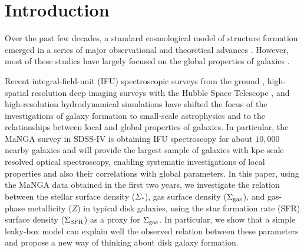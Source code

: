 \documentclass[12pt, appendixfloats, numberedappendix]{emulateapj}
\begin{document}
\section{Introduction}\label{intro}



Over the past few decades, a standard cosmological model of structure formation emerged 
in a series of major observational and theoretical advances \citep[\eg][]{white78a}. 
However, most of these studies have largely focused on the global properties of galaxies
\citep[\eg][]{kauffmann93a, springel05a, somerville15a}.

Recent integral-field-unit (IFU) spectroscopic surveys from the ground \citep[\eg][]{bacon01a, rosales10a, sanchez12a},
high-spatial resolution deep imaging surveys with the Hubble Space Telescope \citep[\eg][]{scoville07a, koekemoer11a}, 
and high-resolution hydrodynamical simulations \citep[\eg][]{vogelsberger14a, hopkins14a} have shifted the focus of 
the investigations of galaxy formation to small-scale astrophysics and to the relationships between local and global properties of galaxies.
In particular, the MaNGA survey \citep[][]{bundy15a} in SDSS-IV \citep[][]{blanton17a} is
obtaining IFU spectroscopy for about $10,000$ nearby galaxies and will provide the largest sample of galaxies with kpc-scale 
resolved optical spectroscopy, enabling systematic investigations of local properties and also their correlations with global parameters.
In this paper, using the MaNGA data obtained in the first two years, we investigate the relation 
between the stellar surface density ($\Sigma_*$), gas surface density ($\Sigma_{\rm gas}$), and gas-phase metallicity
($Z$) in typical disk galaxies,
using the star formation rate (SFR) surface density ($\Sigma_{\rm SFR}$) as a proxy for $\Sigma_{\rm gas}$. 
In particular, we show that a simple leaky-box model can explain well the observed relation between these parameters and propose
a new way of thinking about disk galaxy formation.
\end{document}
